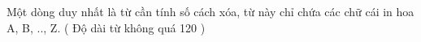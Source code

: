 Một dòng duy nhất là từ cần tính số cách xóa, từ này chỉ chứa các chữ cái in hoa A, B, .., Z. ( Độ dài từ không quá 120 )  

\